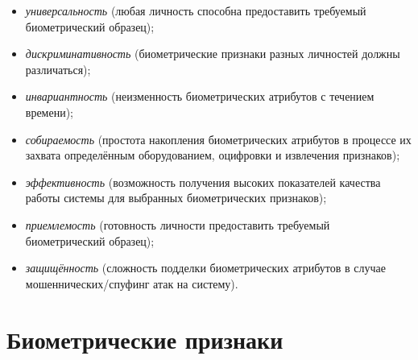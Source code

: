 \documentclass[12pt]{book}
\begin{document}
{\begin{itemize}[topsep=1pt] \itemsep0.1em
\item \textit{универсальность} (любая личность способна предоставить требуемый биометрический образец);
\item \textit{дискриминативность} (биометрические признаки разных личностей должны различаться);
\item \textit{инвариантность} (неизменность биометрических атрибутов с течением времени);
\item \textit{собираемость} (простота накопления биометрических атрибутов в процессе их захвата определённым оборудованием, оцифровки и извлечения признаков);
\item \textit{эффективность} (возможность получения высоких показателей качества работы системы для выбранных биометрических признаков);
\item \textit{приемлемость} (готовность личности предоставить требуемый биометрический образец);
\item \textit{защищённость} (сложность подделки биометрических атрибутов в случае мошеннических/спуфинг атак на систему).
\end{itemize}

}

\section{Биометрические признаки}
\end{document}
